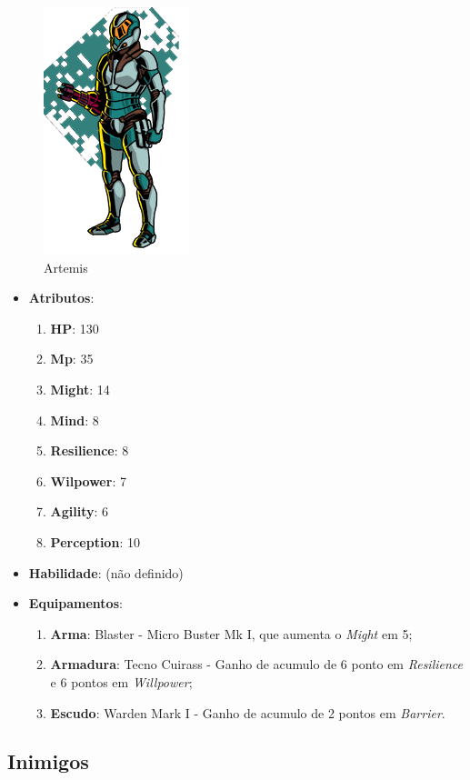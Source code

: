 \documentclass[11pt]{article} %
\begin{document}
\begin{figure}[!htp]
\centering
\includegraphics[scale=0.5]{res/characters/Artemis.png}
\caption{Artemis}
\label{Artemis}
\end{figure}

\begin{itemize}
\item \textbf{Atributos}:
  \begin{enumerate}
    \item \textbf{HP}: 130
    \item \textbf{Mp}: 35
    \item \textbf{Might}: 14
    \item \textbf{Mind}: 8
    \item \textbf{Resilience}: 8
    \item \textbf{Wilpower}: 7
    \item \textbf{Agility}: 6
    \item \textbf{Perception}: 10
  \end{enumerate}
\item \textbf{Habilidade}: (não definido)
\item \textbf{Equipamentos}:
  \begin{enumerate}
    \item \textbf{Arma}: Blaster - Micro Buster Mk I, que aumenta o \textit{Might} em 5;
    \item \textbf{Armadura}: Tecno Cuirass - Ganho de acumulo de 6 ponto em \textit{Resilience} e 6 pontos em \textit{Willpower};
    \item \textbf{Escudo}: Warden Mark I - Ganho de acumulo de 2 pontos em \textit{Barrier}.
  \end{enumerate}
\end{itemize}

\subsection{Inimigos}
\end{document}
